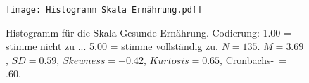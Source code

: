 \begin{figure}[htb]
    \centering
        \texttt{[image: Histogramm Skala Ernährung.pdf]}
        \caption[Histogramm für die Skala Gesunde Ernährung]{Histogramm für die 
        Skala Gesunde Ernährung. Codierung: 1.00 = stimme nicht zu ... 5.00 = stimme 
        vollständig zu. $N = 135$. $M = 3.69$, $SD = 0.59$, $Skewness = -0.42$, 
        $Kurtosis = 0.65$, 
        Cronbachs-\textalpha \ = .60.} 
        \label{Histogramm Skala Ernährung}
\end{figure}
